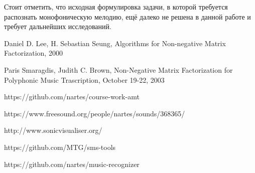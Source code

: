 \documentclass[oneside, final, 12pt]{extarticle}
\begin{document}
  Стоит отметить, что исходная формулировка задачи, в которой требуется
  распознать монофоническую мелодию, ещё далеко не решена в данной работе
  и требует дальнейших исследований.

\cleardoublepage

\begin{thebibliography}{0}






   Daniel D. Lee, H. Sebastian Seung,
  Algorithms for Non-negative Matrix Factorization, 2000

   Paris Smaragdis, Judith C. Brown,
    Non-Negative Matrix Factorization
    for Polyphonic Music Trascription, October 19-22, 2003







   https://github.com/nartes/course-work-amt

   https://www.freesound.org/people/nartes/sounds/368365/ 

   http://www.sonicvisualiser.org/

   https://github.com/MTG/sms-tools

   https://github.com/nartes/music-recognizer

\end{thebibliography}
\end{document}
